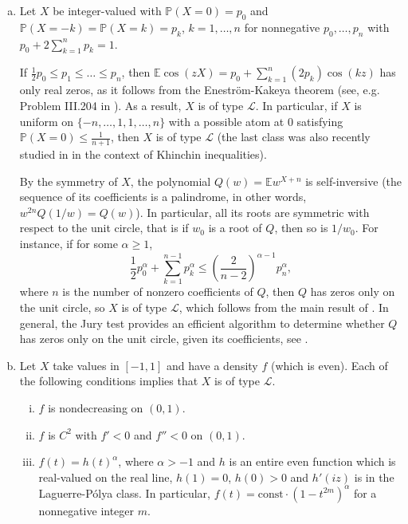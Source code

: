 \documentclass[10pt]{article}
\newcommand{\E}{\mathbb{E}}
\newcommand{\1}{\textbf{1}}
\newcommand{\sL}{\mathscr{L}}
\newcommand{\p}[1]{\mathbb{P}\left( #1 \right)}
\theoremstyle{remark}
\theoremstyle{definition}
\begin{document}
\begin{enumerate}[(a)]

\item 
Let $X$ be integer-valued with $\p{X = 0} = p_0$ and $\p{X = -k} = \p{X = k} = p_k$, $k = 1, \dots, n$ for nonnegative $p_0, \dots, p_n$ with $p_0 + 2\sum_{k=1}^n p_k = 1$. 

If $\frac{1}{2}p_0 \leq p_1 \leq \dots \leq p_n$, then $\E \cos(zX) = p_0 + \sum_{k=1}^n (2p_k)\cos(kz)$ has only real zeros, as it follows from the Enestr\"om-Kakeya theorem (see, e.g. Problem III.204 in \cite{PS1}). As a result, $X$ is of type $\sL$. In particular, if $X$ is uniform on $\{-n,\dots, 1, 1, \dots, n\}$ with a possible atom at $0$ satisfying $\p{X = 0} \leq \frac{1}{n+1}$, then $X$ is of type $\sL$ (the last class was also recently studied in \cite{HT} in the context of Khinchin inequalities).

By the symmetry of $X$, the polynomial $Q(w) = \E w^{X+n}$ is self-inversive (the sequence of its coefficients is a palindrome, in other words, $w^{2n}Q(1/w) = Q(w)$). In particular, all its roots are symmetric with respect to the unit circle, that is if $w_0$ is a root of $Q$, then so is $1/w_0$. For instance, if for some $\alpha \geq 1$,
\[
\frac{1}{2}p_0^\alpha + \sum_{k=1}^{n-1} p_k^\alpha \leq \left(\frac{2}{n-2}\right)^{\alpha-1}p_n^\alpha,
\]
where $n$ is the number of nonzero coefficients of $Q$, then $Q$ has zeros only on the unit circle, so $X$ is of type $\sL$, which follows from the main result of \cite{SV}. In general, the Jury test provides an efficient algorithm to determine whether $Q$ has zeros only on the unit circle, given its coefficients, see \cite{J}.

\item
Let $X$ take values in $[-1,1]$ and have a density $f$ (which is even). Each of the following conditions implies that $X$ is of type $\sL$.
\begin{enumerate}[(i)]
\item $f$ is  nondecreasing on $(0,1)$.

\item $f$ is $C^2$ with $f' < 0$ and $f'' < 0$ on $(0,1)$.

\item $f(t) = h(t)^{\alpha}$, where $\alpha > -1$ and $h$ is an entire even function which is real-valued on the real line, $h(1) = 0$, $h(0) > 0$ and $h'(iz)$ is  in the Laguerre-P\'olya class. In particular, $f(t) = \text{const}\cdot (1-t^{2m})^{\alpha}$ for a nonnegative integer $m$.  
\end{enumerate}


\end{enumerate}
\end{document}
